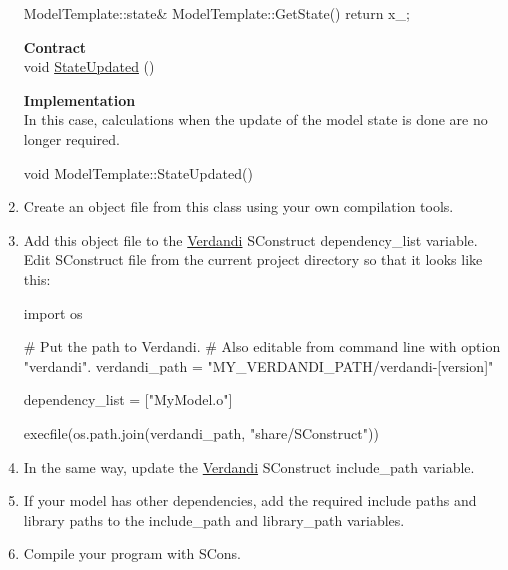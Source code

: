 \documentclass{tufte-book}
\begin{document}
\begin{enumerate}
\begin{frame_cpp}
    ModelTemplate::state& ModelTemplate::GetState()
    {
    	return x_;
    }
\end{frame_cpp}


\textbf{Contract}\\
\hypertarget{class_verdandi_1_1_model_template_a885248c5bbe5a173277a551b3f253277}{
void \hyperlink{class_verdandi_1_1_model_template_a885248c5bbe5a173277a551b3f253277}{\-State\-Updated} ()}
\label{class_verdandi_1_1_model_template_a885248c5bbe5a173277a551b3f253277}

\textbf{Implementation}\\

In this case, calculations when the update of the model state is done are no longer required.

\begin{frame_cpp}
    void ModelTemplate::StateUpdated()
    {

    }
\end{frame_cpp}


\item \-Create an object file from this class using your own compilation tools.
\item \-Add this object file to the \hyperlink{namespace_verdandi}{\-Verdandi} \-S\-Construct {\ttfamily dependency\-\_\-list} variable. \-Edit {\ttfamily \-S\-Construct} file from the current project directory so that it looks like this\-:

\begin{frame_python}
import os

# Put the path to Verdandi.
# Also editable from command line with option "verdandi".
verdandi_path = "MY_VERDANDI_PATH/verdandi-[version]"

dependency_list = ["MyModel.o"]

execfile(os.path.join(verdandi_path, "share/SConstruct"))
\end{frame_python}


\item \-In the same way, update the \hyperlink{namespace_verdandi}{\-Verdandi} \-S\-Construct {\ttfamily include\-\_\-path} variable.
\item \-If your model has other dependencies, add the required include paths and library paths to the {\ttfamily include\-\_\-path} and {\ttfamily library\-\_\-path} variables.
\item \-Compile your program with \-S\-Cons.


\end{enumerate}
\end{document}
